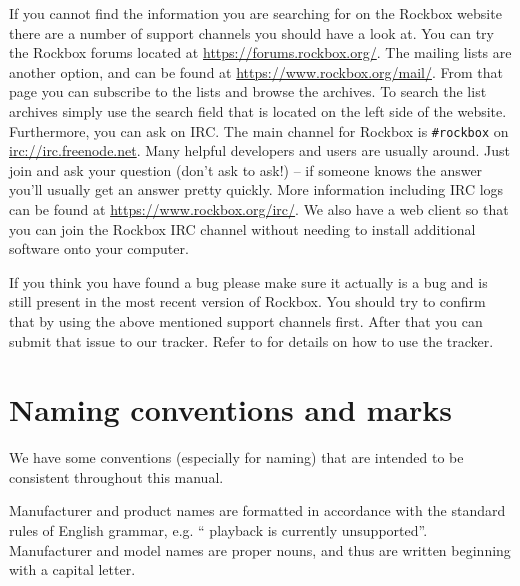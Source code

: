 If you cannot find the information you are searching for on the Rockbox
website there are a number of support channels you should have a look at.
You can try the Rockbox forums located at \url{https://forums.rockbox.org/}.
The mailing lists are another option, and can be found at
\url{https://www.rockbox.org/mail/}. From that page you can subscribe to the
lists and browse the archives. To search the list archives simply use
the search field that is located on the left side of the website.
Furthermore,  you can ask on IRC. The main channel for Rockbox is
\texttt{\#rockbox} on \url{irc://irc.freenode.net}. Many helpful developers
and users are usually around. Just join and ask your question (don't ask to
ask!) -- if someone knows the answer you'll
usually get an answer pretty quickly. More information including IRC logs
can be found at \url{https://www.rockbox.org/irc/}. We also have a web client
so that you can join the Rockbox IRC channel without needing
to install additional software onto your computer.

If you think you have found a bug please make sure it actually is a bug and is
still present in the most recent version of Rockbox. You should try to
confirm that by using the above mentioned support channels first. After that
you can submit that issue to our tracker. Refer to 
for details on how to use the tracker.


\section{Naming conventions and marks}
We have some conventions (especially for naming) that are intended to be
consistent throughout this manual.

Manufacturer and product names are formatted in accordance with the standard
rules of English grammar, e.g. ``\playerman{} playback is currently
unsupported''. Manufacturer and model names are proper nouns, and
thus are written beginning with a capital letter.

